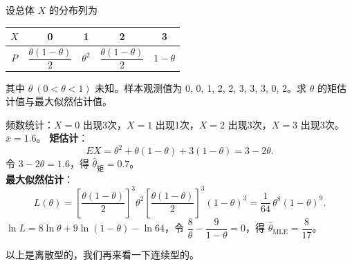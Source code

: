 \documentclass[lang=cn,11pt]{elegantbook}
\begin{document}
\begin{exercise}\label{exer:7-discrete-0123}
设总体 \(X\) 的分布列为
\begin{center}
\begin{tabular}{c|cccc}
\(X\) & 0 & 1 & 2 & 3 \\
\hline
\(P\) & \(\dfrac{\theta(1-\theta)}{2}\) & \(\theta^2\) & \(\dfrac{\theta(1-\theta)}{2}\) & \(1-\theta\)
\end{tabular}
\end{center}
其中 \(\theta\ (0 < \theta < 1)\) 未知。样本观测值为 0, 0, 1, 2, 2, 3, 3, 3, 0, 2。求 \(\theta\) 的矩估计值与最大似然估计值。
\end{exercise}
\begin{solution}
频数统计：\(X=0\) 出现3次，\(X=1\) 出现1次，\(X=2\) 出现3次，\(X=3\) 出现3次。\(\overline{x} = 1.6\)。
\textbf{矩估计}：
\[
EX = \theta^2 + \theta(1-\theta) + 3(1-\theta) = 3-2\theta.
\]
令 \(3-2\theta = 1.6\)，得 \(\hat{\theta}_{\text{矩}} = 0.7\)。\\
\textbf{最大似然估计}：
\[
L(\theta) = \left[\frac{\theta(1-\theta)}{2}\right]^{\!3}\theta^2\!\left[\frac{\theta(1-\theta)}{2}\right]^{\!3}(1-\theta)^3 = \frac{1}{64}\,\theta^8(1-\theta)^9.
\]
\(\ln L = 8\ln\theta + 9\ln(1-\theta) - \ln 64\)，令 \(\dfrac{8}{\theta} - \dfrac{9}{1-\theta} = 0\)，得 \(\hat{\theta}_{\text{MLE}} = \dfrac{8}{17}\)。
\end{solution}

\begin{remark}
以上是离散型的，我们再来看一下连续型的。
\end{remark}
\end{document}

